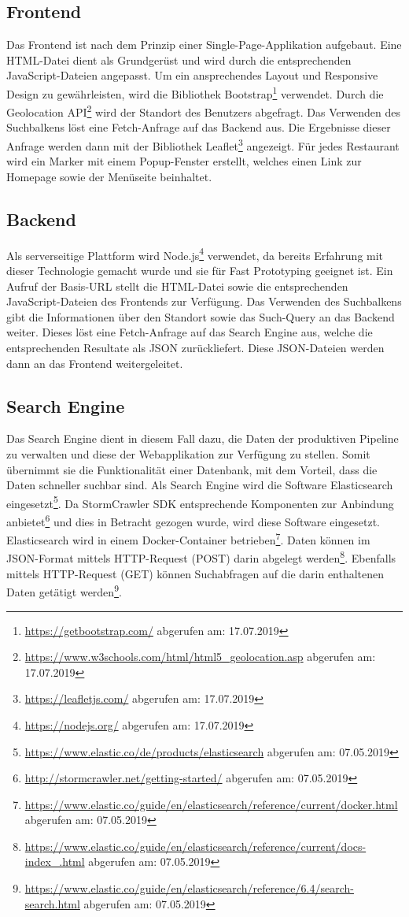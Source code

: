 \subsection{Frontend}
Das Frontend ist nach dem Prinzip einer Single-Page-Applikation aufgebaut.
Eine HTML-Datei dient als Grundgerüst und wird durch die entsprechenden JavaScript-Dateien angepasst.
Um ein ansprechendes Layout und Responsive Design zu gewährleisten, wird die Bibliothek \glqq Bootstrap\footnote{\url{https://getbootstrap.com/} abgerufen am: 17.07.2019}\grqq{} verwendet.
Durch die Geolocation API\footnote{\url{https://www.w3schools.com/html/html5_geolocation.asp} abgerufen am: 17.07.2019} wird der Standort des Benutzers abgefragt.
Das Verwenden des Suchbalkens löst eine Fetch-Anfrage auf das Backend aus.
Die Ergebnisse dieser Anfrage werden dann mit der Bibliothek \glqq Leaflet\footnote{\url{https://leafletjs.com/} abgerufen am: 17.07.2019}\grqq{} angezeigt.
Für jedes Restaurant wird ein Marker mit einem Popup-Fenster erstellt, welches einen Link zur Homepage sowie der Menüseite beinhaltet.
\subsection{Backend}
Als serverseitige Plattform wird \glqq Node.js\footnote{\url{https://nodejs.org/} abgerufen am: 17.07.2019}\grqq{} verwendet, da bereits Erfahrung mit dieser Technologie gemacht wurde und sie für Fast Prototyping geeignet ist.
Ein Aufruf der Basis-URL stellt die HTML-Datei sowie die entsprechenden JavaScript-Dateien des Frontends zur Verfügung.
Das Verwenden des Suchbalkens gibt die Informationen über den Standort sowie das Such-Query an das Backend weiter.
Dieses löst eine Fetch-Anfrage auf das Search Engine aus, welche die entsprechenden Resultate als JSON zurückliefert.
Diese JSON-Dateien werden dann an das Frontend weitergeleitet.
\subsection{Search Engine}

Das Search Engine dient in diesem Fall dazu, die Daten der produktiven Pipeline zu verwalten und diese der Webapplikation zur Verfügung zu stellen.
Somit übernimmt sie die Funktionalität einer Datenbank, mit dem Vorteil, dass die Daten schneller suchbar sind.
Als Search Engine wird die Software \glqq Elasticsearch\grqq{} eingesetzt\footnote{\url{https://www.elastic.co/de/products/elasticsearch} abgerufen am: 07.05.2019}.
Da StormCrawler SDK entsprechende Komponenten zur Anbindung anbietet\footnote{\url{http://stormcrawler.net/getting-started/} abgerufen am: 07.05.2019} und dies in Betracht gezogen wurde, wird diese Software eingesetzt.
Elasticsearch wird in einem Docker-Container betrieben\footnote{\url{https://www.elastic.co/guide/en/elasticsearch/reference/current/docker.html} abgerufen am: 07.05.2019}.
Daten können im JSON-Format mittels HTTP-Request (POST) darin abgelegt werden\footnote{\url{https://www.elastic.co/guide/en/elasticsearch/reference/current/docs-index_.html} abgerufen am: 07.05.2019}.
Ebenfalls mittels HTTP-Request (GET) können Suchabfragen auf die darin enthaltenen Daten getätigt werden\footnote{\url{https://www.elastic.co/guide/en/elasticsearch/reference/6.4/search-search.html} abgerufen am: 07.05.2019}.

